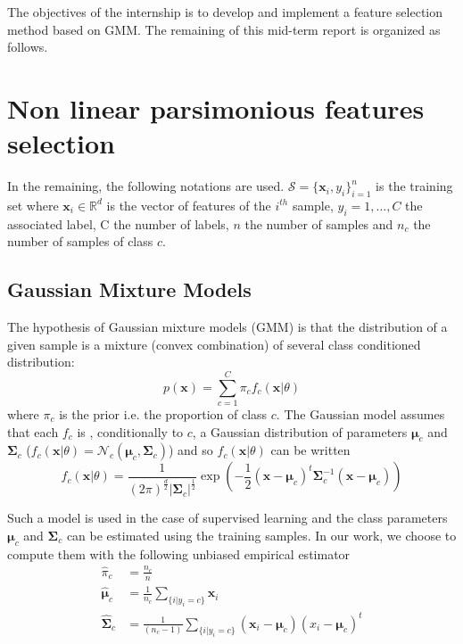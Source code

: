 \documentclass[a4paper,11pt,DIV=16]{scrartcl}
\begin{document}
The objectives of the internship is to develop and implement a feature selection method based on GMM. The remaining of this mid-term report is organized as follows.

\section{Non linear parsimonious features selection}
\label{sec:theory}

In the remaining, the following notations are used. $\mathcal{S} = \{\mathbf{x}_i,y_i\}_{i=1}^{n}$ is the training set where $\mathbf{x}_i \in \mathbb{R}^d$ is the vector of features of the $i^{th}$ sample, $y_i = 1,...,C$ the associated label, C the number of labels, $n$ the number of samples and $n_c$ the number of samples of class $c$.

    \subsection{Gaussian Mixture Models}

    The hypothesis of Gaussian mixture models (GMM) is that the distribution of a given sample is a mixture (convex combination) of several class conditioned distribution:
    \begin{equation}
        p(\mathbf{x}) = \sum_{c=1}^{C} \pi_c f_c(\mathbf{x}|\theta)
    \end{equation}
    where $\pi_c$ is the prior i.e. the proportion of class $c$.
    The Gaussian model assumes that each $f_c$ is , conditionally to $c$, a Gaussian distribution of parameters $\boldsymbol{\mu}_c$ and $\boldsymbol{\Sigma}_c$ ($f_c(\mathbf{x}|\theta) = \mathcal{N}_c(\boldsymbol{\mu}_c, \boldsymbol{\Sigma}_c)$) and so $f_c(\mathbf{x}|\theta)$ can be written
    \begin{equation*}
        f_c(\mathbf{x}|\theta) = \frac{1}{(2\pi)^{\frac{d}{2}} |\boldsymbol{\Sigma}_c|^{\frac{1}{2}}} \exp \left( -\frac{1}{2} (\mathbf{x} - \boldsymbol{\mu}_c)^t \boldsymbol{\Sigma}_c^{-1} (\mathbf{x} - \boldsymbol{\mu}_c) \right)
    \end{equation*}

    Such a model is used in the case of supervised learning and the class parameters $\boldsymbol{\mu}_c$ and $\boldsymbol{\Sigma}_c$ can be estimated using the training samples. In our work, we choose to compute them with the following unbiased empirical estimator
    \begin{align}
        \hat{\pi}_c &= \frac{n_c}{n}\\
        \hat{\boldsymbol{\mu}}_c &= \frac{1}{n_c} \sum_{\{i|y_i = c\}} \mathbf{x}_i \\
        \hat{\boldsymbol{\Sigma}}_c &= \frac{1}{(n_c - 1)} \sum_{\{i|y_i = c\}} (\mathbf{x}_i - \boldsymbol{\mu}_c) (\boldsymbol{}x_i - \boldsymbol{\mu}_c)^t
    \end{align}
\end{document}
